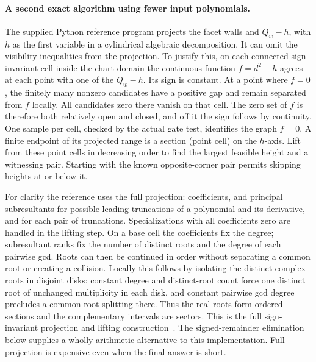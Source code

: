 \documentclass[10pt,letterpaper]{article}
\begin{document}
\paragraph{A second exact algorithm using fewer input polynomials.}
The supplied Python reference program projects the facet walls and $Q_w-h$, with $h$ as the first variable in a cylindrical algebraic decomposition. It can omit the visibility inequalities from the projection. To justify this, on each connected sign-invariant cell inside the chart domain the continuous function $f=d^2-h$ agrees at each point with one of the $Q_w-h$. Its sign is constant. At a point where $f=0$, the finitely many nonzero candidates have a positive gap and remain separated from $f$ locally. All candidates zero there vanish on that cell. The zero set of $f$ is therefore both relatively open and closed, and off it the sign follows by continuity. One sample per cell, checked by the actual gate test, identifies the graph $f=0$. A finite endpoint of its projected range is a section (point cell) on the $h$-axis. Lift from these point cells in decreasing order to find the largest feasible height and a witnessing pair. Starting with the known opposite-corner pair permits skipping heights at or below it.
\par For clarity the reference uses the full projection: coefficients, and principal subresultants for possible leading truncations of a polynomial and its derivative, and for each pair of truncations. Specializations with all coefficients zero are handled in the lifting step. On a base cell the coefficients fix the degree; subresultant ranks fix the number of distinct roots and the degree of each pairwise gcd. Roots can then be continued in order without separating a common root or creating a collision. Locally this follows by isolating the distinct complex roots in disjoint disks: constant degree and distinct-root count force one distinct root of unchanged multiplicity in each disk, and constant pairwise gcd degree precludes a common root splitting there. Thus the real roots form ordered sections and the complementary intervals are sectors. This is the full sign-invariant projection and lifting construction~\cite{cad}. The signed-remainder elimination below supplies a wholly arithmetic alternative to this implementation. Full projection is expensive even when the final answer is short.
\end{document}
